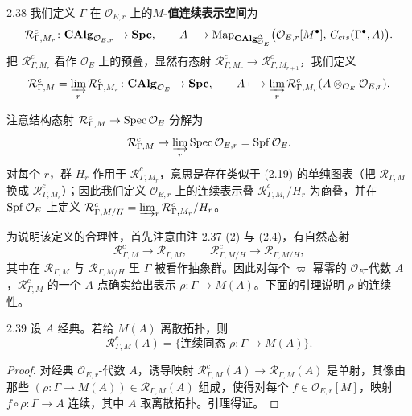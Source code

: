\begin{defn}{2.38}
我们定义 $\Gamma$ 在 $\mathcal O_{E,r}$ 上的\textbf{$M$-值连续表示空间}为
\[
\mathcal R^c_{\Gamma,M_r}\colon \mathbf{CAlg}_{\mathcal O_{E,r}} \to \mathbf{Spc},\qquad
A \longmapsto \operatorname{Map}_{\mathbf{CAlg}^\Delta_{\mathcal O_E}}\bigl(\mathcal O_{E,r}[M^\bullet],\, C_{cts}(\Gamma^\bullet,A)\bigr).
\]
把 $\mathcal R^c_{\Gamma,M_r}$ 看作 $\mathcal O_E$ 上的预叠，显然有态射 $\mathcal R^c_{\Gamma,M_r} \to \mathcal R^c_{\Gamma,M_{r+1}}$，我们定义
\[
\mathcal R^c_{\Gamma,M} = \varinjlim_r \mathcal R^c_{\Gamma,M_r}\colon \mathbf{CAlg}_{\mathcal O_E} \to \mathbf{Spc},\qquad
A \longmapsto \varinjlim_r \mathcal R^c_{\Gamma,M_r}(A\otimes_{\mathcal O_E}\mathcal O_{E,r}).
\]
\label{def:zhu2-2-38}
\end{defn}

注意结构态射 $\mathcal R^c_{\Gamma,M} \to \operatorname{Spec}\mathcal O_E$ 分解为
\[
\mathcal R^c_{\Gamma,M} \to \varinjlim_r \operatorname{Spec}\mathcal O_{E,r} = \operatorname{Spf}\mathcal O_E .
\]
对每个 $r$，群 $H_r$ 作用于 $\mathcal R^c_{\Gamma,M_r}$，意思是存在类似于 (2.19) 的单纯图表（把 $\mathcal R_{\Gamma,M}$ 换成 $\mathcal R^c_{\Gamma,M_r}$）；因此我们定义 $\mathcal O_{E,r}$ 上的连续表示叠 $\mathcal R^c_{\Gamma,M_r}/H_r$ 为商叠，并在 $\operatorname{Spf}\mathcal O_E$ 上定义 $\mathcal R^c_{\Gamma,M/H} = \varinjlim_r \mathcal R^c_{\Gamma,M_r}/H_r$。

为说明该定义的合理性，首先注意由注 2.37 (2) 与 (2.4)，有自然态射
\begin{equation}
\tag{2.28}
\mathcal R^c_{\Gamma,M} \to \mathcal R_{\Gamma,M}, \qquad \mathcal R^c_{\Gamma,M/H} \to \mathcal R_{\Gamma,M/H},
\end{equation}
其中在 $\mathcal R_{\Gamma,M}$ 与 $\mathcal R_{\Gamma,M/H}$ 里 $\Gamma$ 被看作抽象群。因此对每个 $\varpi$ 幂零的 $\mathcal O_E$-代数 $A$，$\mathcal R^c_{\Gamma,M}$ 的一个 $A$-点确实给出表示 $\rho\colon \Gamma \to M(A)$。下面的引理说明 $\rho$ 的连续性。

\begin{lem}{2.39}
设 $A$ 经典。若给 $M(A)$ 离散拓扑，则
\[
\mathcal R^c_{\Gamma,M}(A) = \bigl\{\text{连续同态 } \rho\colon \Gamma \to M(A)\bigr\}.
\]
\label{lem:zhu2-2-39}
\end{lem}

\begin{proof}
对经典 $\mathcal O_{E,r}$-代数 $A$，诱导映射 $\mathcal R^c_{\Gamma,M}(A) \to \mathcal R_{\Gamma,M}(A)$ 是单射，其像由那些 $(\rho\colon \Gamma \to M(A)) \in \mathcal R_{\Gamma,M}(A)$ 组成，使得对每个 $f \in \mathcal O_{E,r}[M]$，映射 $f\circ\rho\colon \Gamma \to A$ 连续，其中 $A$ 取离散拓扑。引理得证。
\end{proof}

